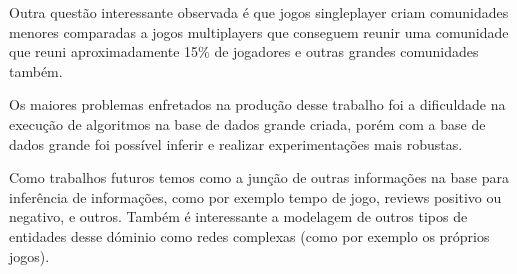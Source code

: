 \documentclass[12pt]{article}
\begin{document}
Outra questão interessante observada é que jogos singleplayer criam comunidades menores comparadas a jogos multiplayers que conseguem reunir uma comunidade que reuni aproximadamente 15\% de jogadores e outras grandes comunidades também.

Os maiores problemas enfretados na produção desse trabalho foi a dificuldade na execução de algoritmos na base de dados grande criada, porém com a base de dados grande foi possível inferir e realizar experimentações mais robustas.

Como trabalhos futuros temos como a junção de outras informações na base para inferência de informações, como por exemplo tempo de jogo, reviews positivo ou negativo, e outros. Também é interessante a modelagem de outros tipos de entidades desse dóminio como redes complexas (como por exemplo os próprios jogos).



\end{document}
